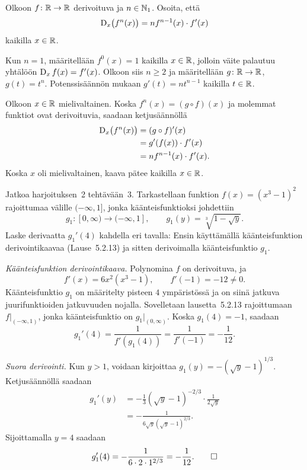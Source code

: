 \documentclass[11pt,a4paper]{amsart}
\theoremstyle{definition}
\begin{document}
\begin{exercise}
  Olkoon \(f \colon \mathbb{R} \to \mathbb{R}\) derivoituva ja \(n \in \mathbb{N}_1\).
  Osoita, että
  \[
    \operatorname{D}_{x}\bigl(f^n(x)\bigr) = n f^{n-1}(x) \cdot f'(x)
  \]
  kaikilla \(x \in \mathbb{R}\).
\end{exercise}

\begin{solution}
  Kun \(n = 1\), määritellään \(f^0(x) = 1\) kaikilla \(x \in \mathbb{R}\),
  jolloin väite palautuu yhtälöön \(\operatorname{D}_{x} f(x) = f'(x)\).
  Olkoon siis \(n \geq 2\) ja määritellään
  \(g \colon \mathbb{R} \to \mathbb{R}\), \(g(t) = t^n\). Potenssisäännön mukaan
  \(g'(t) = n t^{n-1}\) kaikilla \(t \in \mathbb{R}\).

  Olkoon \(x \in \mathbb{R}\) mielivaltainen. Koska \(f^n(x) = (g \circ f)(x)\)
  ja molemmat funktiot ovat derivoituvia, saadaan ketjusäännöllä
  \[
    \begin{aligned}
      \operatorname{D}_{x}\bigl(f^n(x)\bigr) &= (g \circ f)'(x) \\
      &= g'(f(x)) \cdot f'(x) \\
      &= n f^{n-1}(x) \cdot f'(x).
    \end{aligned}
  \]
  Koska \(x\) oli mielivaltainen, kaava pätee kaikilla \(x \in \mathbb{R}\).
\end{solution}

\newpage

\begin{exercise}
  Jatkoa harjoituksen~2 tehtävään~3. Tarkastellaan funktion
  \(f(x) = (x^3 - 1)^2\) rajoittumaa välille \((-\infty, 1]\),
  jonka käänteisfunktioksi johdettiin
  \[
    g_1 \colon [0, \infty) \to (-\infty, 1],
    \qquad g_1(y) = \sqrt[3]{1 - \sqrt{y}}.
  \]
  Laske derivaatta \(g_1'(4)\) kahdella eri tavalla: Ensin käyttämällä
  käänteisfunktion derivointikaavaa (Lause~5.2.13) ja sitten
  derivoimalla käänteisfunktio \(g_1\).
\end{exercise}

\begin{solution}
  \emph{Käänteisfunktion derivointikaava.}
  Polynomina \(f\) on derivoituva, ja
  \[
    f'(x) = 6x^2(x^3 - 1),
    \qquad f'(-1) = -12 \neq 0.
  \]
  Käänteisfunktio \(g_1\) on määritelty pisteen \(4\) ympäristössä
  ja on siinä jatkuva juurifunktioiden jatkuvuuden nojalla.
  Sovelletaan lausetta~5.2.13 rajoittumaan \(f|_{(-\infty, 1)}\),
  jonka käänteisfunktio on \(g_1|_{(0, \infty)}\).
  Koska \(g_1(4) = -1\), saadaan
  \[
    g_1'(4) = \frac{1}{f'(g_1(4))} = \frac{1}{f'(-1)} = -\frac{1}{12}.
  \]

  \emph{Suora derivointi.}
  Kun \(y > 1\), voidaan kirjoittaa \(g_1(y) = -(\sqrt{y} - 1)^{1/3}\).
  Ketjusäännöllä saadaan
  \[
    \begin{aligned}
      g_1'(y) &= -\frac{1}{3}(\sqrt{y} - 1)^{-2/3} \cdot \frac{1}{2\sqrt{y}} \\
      &= -\frac{1}{6\sqrt{y}(\sqrt{y} - 1)^{2/3}}.
    \end{aligned}
  \]
  Sijoittamalla \(y = 4\) saadaan
  \[
    g_1'(4) = -\frac{1}{6 \cdot 2 \cdot 1^{2/3}} = -\frac{1}{12}.
    \qedhere
  \]
\end{solution}
\end{document}
